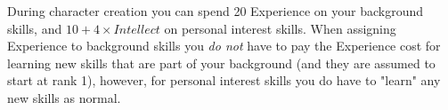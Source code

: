During character creation you can spend 20 Experience on your background skills,
and $10 + 4\times Intellect$ on personal interest skills. 
When assigning Experience to background skills you \textit{do not} have to pay 
the Experience cost for learning new skills that are part of your background (and they are assumed to start at rank 1),
however, for personal interest skills you do have to "learn" any new skills as normal.




